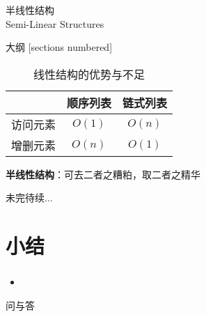 \begin{standout}[第二章]
    半线性结构\\
    Semi-Linear Structures
\end{standout}

\begin{frame}{大纲}
    [sections numbered]
    \tableofcontents
\end{frame}

\begin{frame}
    \begin{table}
        \small
        \label{tab:linear_structures_disadvantages}
        \caption{线性结构的优势与不足}
        \begin{tabular}{rcc}
            \toprule
            & \textbf{顺序列表} & \textbf{链式列表} \\
            \midrule
            访问元素 & $O(1)$ & $O(n)$ \\
            增删元素 & $O(n)$ & $O(1)$ \\
            \bottomrule
        \end{tabular}
    \end{table}
    \pause
    \centering
    \textbf{半线性结构}：可去二者之糟粕，取二者之精华
\end{frame}





\begin{standout}[]
    未完待续$\dots$
\end{standout}

\section{小结}

\begin{frame}
    \frametitle{\insertsectionhead}
    \begin{itemize}
        \item 
    \end{itemize}
\end{frame}

\begin{standout}[]
    问与答
\end{standout}